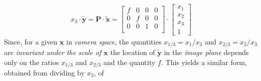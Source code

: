 \begin{equation*}
\begin{split}
x_3\cdot\mathbf{\tilde{y}}
=
\mathbf{P}\cdot\mathbf{\tilde{x}}
=
\begin{bmatrix}
f & 0 & 0 & 0\\
0 & f & 0 & 0\\
0 & 0 & 1 & 0\\
\end{bmatrix}\cdot\begin{bmatrix}x_1\\x_2\\x_3\\1\end{bmatrix}
\end{split}
\end{equation*}%
Since, for a given $\mathbf{x}$ in \textit{camera space}, the quantities 
$x_{1/3}=x_1/x_3$ and $x_{2/3}=x_2/x_3$ 
are \textit{invariant under the scale of $\mathbf{x}$} 
the location of $\mathbf{\tilde{y}}$ in the \textit{image plane} depends only on the ratios $x_{1/3}$ and $x_{2/3}$ and the quantity $f$. This yields a similar form, obtained from dividing by $x_3$, of

